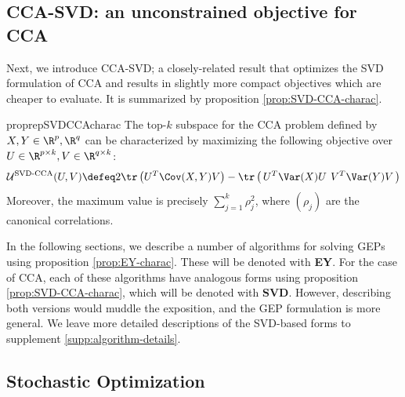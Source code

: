 \subsection{CCA-SVD: an unconstrained objective for CCA}\label{sec:gep-ey-formulation}
Next, we introduce CCA-SVD; a closely-related result that optimizes the SVD formulation of CCA and results in slightly more compact objectives which are cheaper to evaluate. It is summarized by proposition \ref{prop:SVD-CCA-charac}.

\begin{restatable}{proprep}{SVDCCAcharac}
    \label{prop:SVD-CCA-charac}
    The top-$k$ subspace for the CCA problem defined by $X,Y \in \R^p,\R^q$ can be characterized by maximizing the following objective over $U \in \R^{p \times k}, V \in \R^{q \times k}$:
    \begin{align}\label{eq:EY-charac}
        \mathcal{U}^\text{SVD-CCA}(U,V)
        \defeq 2 \tr\left({U}^T \Cov(X,Y) {V} \right) - \tr\left(\, {U}^T \Var(X) {U} \:\, {V}^T \Var(Y) {V} \,\right)
    \end{align}
    Moreover, the maximum value is precisely $\sum_{j=1}^k \rho_j^2$, where $(\rho_j)$ are the canonical correlations.
\end{restatable}

In the following sections, we describe a number of algorithms for solving GEPs using proposition \ref{prop:EY-charac}.
These will be denoted with \textbf{EY}. For the case of CCA, each of these algorithms have analogous forms using proposition \ref{prop:SVD-CCA-charac}, which will be denoted with \textbf{SVD}. However, describing both versions would muddle the exposition, and the GEP formulation is more general. We leave more detailed descriptions of the SVD-based forms to supplement \ref{supp:algorithm-details}.

\subsection{Stochastic Optimization}

